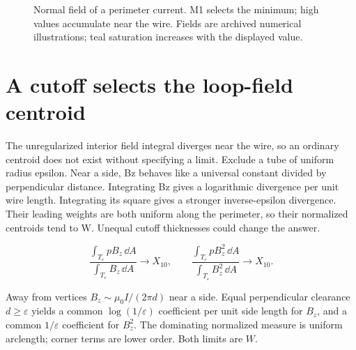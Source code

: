 \documentclass[11pt,oneside,openany]{book}
\begin{document}
\begin{figure}[htbp]
\caption[Normal field of a perimeter current]{Normal field of a perimeter current. M1 selects the minimum; high values accumulate near the wire. Fields are archived numerical illustrations; teal saturation increases with the displayed value.}\label{fig:field-M1}
\end{figure}

\section{A cutoff selects the loop-field centroid}\label{sec:slide24}

The unregularized interior field integral diverges near the wire, so an ordinary centroid does not exist without specifying a limit. Exclude a tube of uniform radius epsilon. Near a side, Bz behaves like a universal constant divided by perpendicular distance. Integrating Bz gives a logarithmic divergence per unit wire length. Integrating its square gives a stronger inverse-epsilon divergence. Their leading weights are both uniform along the perimeter, so their normalized centroids tend to W. Unequal cutoff thicknesses could change the answer.


\[\frac{\int_{T_\varepsilon}pB_z\,\dd A}{\int_{T_\varepsilon}B_z\,\dd A}\to X_{10},\qquad\frac{\int_{T_\varepsilon}pB_z^2\,\dd A}{\int_{T_\varepsilon}B_z^2\,\dd A}\to X_{10}.\]



Away from vertices $B_z\sim\mu_0I/(2\pi d)$ near a side.
Equal perpendicular clearance $d\ge\varepsilon$ yields a common
$\log(1/\varepsilon)$ coefficient per unit side length for $B_z$,
and a common $1/\varepsilon$ coefficient for $B_z^2$.
The dominating normalized measure is uniform arclength; corner
terms are lower order. Both limits are $W$.
\end{document}
